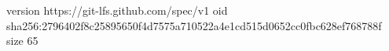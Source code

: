 version https://git-lfs.github.com/spec/v1
oid sha256:2796402f8c25895650f4d7575a710522a4e1cd515d0652cc0fbc628ef768788f
size 65
